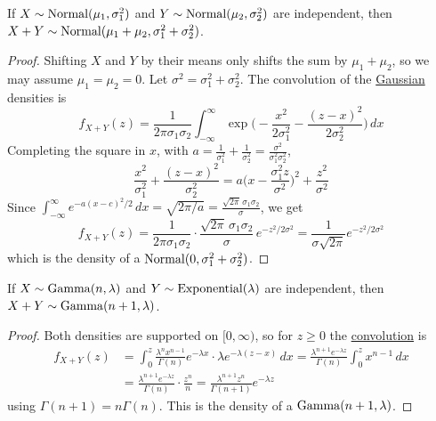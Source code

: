   \begin{theorem}
    \label{thm:sum-of-independent-gaussians-is-gaussian}
    If $X \sim \operatorname{Normal}(\mu_1, \sigma_1^2)$ and $Y \sim \operatorname{Normal}(\mu_2, \sigma_2^2)$ are independent, then $X + Y \sim \operatorname{Normal}(\mu_1 + \mu_2, \sigma_1^2 + \sigma_2^2)$. 
  \end{theorem}
  \begin{proof}
    Shifting $X$ and $Y$ by their means only shifts the sum by $\mu_1 + \mu_2$, so we may assume $\mu_1 = \mu_2 = 0$. Let $\sigma^2 = \sigma_1^2 + \sigma_2^2$. The convolution of the \hyperref[def:gaussian-random-variable]{Gaussian} densities is 
    \begin{equation}
      f_{X+Y} (z) = \frac{1}{2 \pi \sigma_1 \sigma_2} \int_{-\infty}^\infty \exp \bigg( -\frac{x^2}{2 \sigma_1^2} - \frac{(z - x)^2}{2 \sigma_2^2} \bigg) \,dx
    \end{equation}
    Completing the square in $x$, with $a = \frac{1}{\sigma_1^2} + \frac{1}{\sigma_2^2} = \frac{\sigma^2}{\sigma_1^2 \sigma_2^2}$, 
    \begin{equation}
      \frac{x^2}{\sigma_1^2} + \frac{(z - x)^2}{\sigma_2^2} = a \bigg( x - \frac{\sigma_1^2 z}{\sigma^2} \bigg)^2 + \frac{z^2}{\sigma^2}
    \end{equation}
    Since $\int_{-\infty}^\infty e^{-a (x - c)^2 / 2} \,dx = \sqrt{2 \pi / a} = \frac{\sqrt{2 \pi} \, \sigma_1 \sigma_2}{\sigma}$, we get 
    \begin{equation}
      f_{X+Y} (z) = \frac{1}{2 \pi \sigma_1 \sigma_2} \cdot \frac{\sqrt{2 \pi} \, \sigma_1 \sigma_2}{\sigma} \, e^{-z^2 / 2 \sigma^2} = \frac{1}{\sigma \sqrt{2 \pi}} e^{-z^2 / 2 \sigma^2}
    \end{equation}
    which is the density of a $\operatorname{Normal}(0, \sigma_1^2 + \sigma_2^2)$. 
  \end{proof}

  \begin{theorem}
    \label{thm:sum-of-independent-gamma-and-exponential-is-gamma}
    If $X \sim \operatorname{Gamma}(n, \lambda)$ and $Y \sim \operatorname{Exponential}(\lambda)$ are independent, then $X + Y \sim \operatorname{Gamma}(n + 1, \lambda)$. 
  \end{theorem}
  \begin{proof}
    Both densities are supported on $[0, \infty)$, so for $z \geq 0$ the \hyperref[def:convolution]{convolution} is 
    \begin{align*}
      f_{X+Y} (z) & = \int_0^z \frac{\lambda^n x^{n-1}}{\Gamma(n)} e^{-\lambda x} \cdot \lambda e^{-\lambda (z - x)} \,dx = \frac{\lambda^{n+1} e^{-\lambda z}}{\Gamma(n)} \int_0^z x^{n-1} \,dx \\
      & = \frac{\lambda^{n+1} e^{-\lambda z}}{\Gamma(n)} \cdot \frac{z^n}{n} = \frac{\lambda^{n+1} z^n}{\Gamma(n+1)} e^{-\lambda z}
    \end{align*}
    using $\Gamma(n+1) = n \Gamma(n)$. This is the density of a $\operatorname{Gamma}(n+1, \lambda)$. 
  \end{proof}

